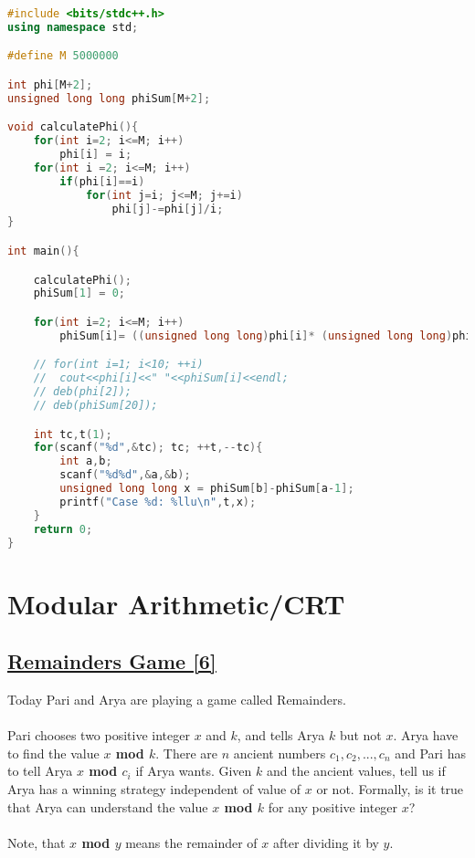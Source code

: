\documentclass[10pt,a4paper]{article}
\begin{document}
\begin{itemize}
\begin{lstlisting}[language=C++, caption={Mathematically Hard}, label={1st:code}, mathescape=true, breaklines=true]
#include <bits/stdc++.h>
using namespace std;

#define M 5000000

int phi[M+2];
unsigned long long phiSum[M+2];

void calculatePhi(){
    for(int i=2; i<=M; i++)
        phi[i] = i;
    for(int i =2; i<=M; i++)
        if(phi[i]==i)
            for(int j=i; j<=M; j+=i)
                phi[j]-=phi[j]/i;
}

int main(){

    calculatePhi();
    phiSum[1] = 0;

    for(int i=2; i<=M; i++)
        phiSum[i]= ((unsigned long long)phi[i]* (unsigned long long)phi[i])+phiSum[i-1];

    // for(int i=1; i<10; ++i)
    //  cout<<phi[i]<<" "<<phiSum[i]<<endl;
    // deb(phi[2]);
    // deb(phiSum[20]);

    int tc,t(1);
    for(scanf("%d",&tc); tc; ++t,--tc){
        int a,b;
        scanf("%d%d",&a,&b);
        unsigned long long x = phiSum[b]-phiSum[a-1];
        printf("Case %d: %llu\n",t,x);
    }
    return 0;
}

\end{lstlisting}

\section{Modular Arithmetic/CRT}
\subsection*{\href{https://codeforces.com/problemset/problem/687/B}{\underline{Remainders Game [6]}}}
Today Pari and Arya are playing a game called Remainders.
\\ \\
Pari chooses two positive integer $x$ and $k$, and tells Arya $k$ but not $x$. Arya have to find the value \textbf{$x$ mod $k$}. There are $n$ ancient numbers $c_1,c_2,...,c_n$ and Pari has to tell Arya \textbf{$x$ mod $c_i$} if Arya wants. Given $k$ and the ancient values, tell us if Arya has a winning strategy independent of value of $x$ or not. Formally, is it true that Arya can understand the value \textbf{$x$ mod $k$} for any positive integer $x$?
\\ \\
Note, that \textbf{$x$ mod $y$} means the remainder of $x$ after dividing it by $y$.


\end{itemize}
\end{document}
